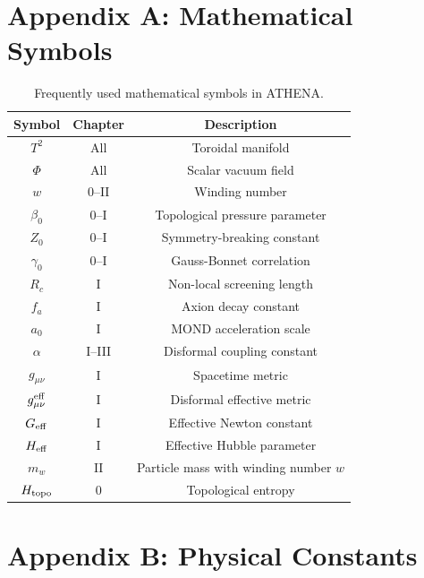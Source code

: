 \documentclass[12pt,oneside]{book}
\begin{document}
\chapter{Appendix A: Mathematical Symbols}

\begin{table}[H]
\centering
\begin{tabular}{|c|c|c|}
\hline
\textbf{Symbol} & \textbf{Chapter} & \textbf{Description} \\
\hline
$T^2$ & All & Toroidal manifold \\
$\Phi$ & All & Scalar vacuum field \\
$w$ & 0--II & Winding number \\
$\beta_0$ & 0--I & Topological pressure parameter \\
$Z_0$ & 0--I & Symmetry-breaking constant \\
$\gamma_0$ & 0--I & Gauss-Bonnet correlation \\
$R_c$ & I & Non-local screening length \\
$f_a$ & I & Axion decay constant \\
$a_0$ & I & MOND acceleration scale \\
$\alpha$ & I--III & Disformal coupling constant \\
$g_{\mu\nu}$ & I & Spacetime metric \\
$g_{\mu\nu}^{\rm eff}$ & I & Disformal effective metric \\
$G_{\rm eff}$ & I & Effective Newton constant \\
$H_{\rm eff}$ & I & Effective Hubble parameter \\
$m_w$ & II & Particle mass with winding number $w$ \\
$H_{\rm topo}$ & 0 & Topological entropy \\
\hline
\end{tabular}
\caption{Frequently used mathematical symbols in ATHENA.}
\end{table}

\chapter{Appendix B: Physical Constants}
\end{document}
